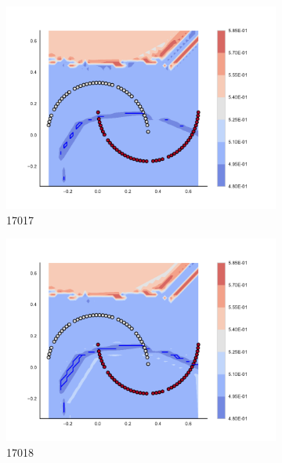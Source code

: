 \begin{figure}[h]
\begin{subfigure}[b]{0.09\textwidth}
    \includegraphics[clip, trim=2.35cm 1.75cm 4.5cm 0cm,width=\textwidth]{img/convergence/17017.pdf}
    \caption{17017}
    \label{fig:convergence_17017}
\end{subfigure}
%
\begin{subfigure}[b]{0.09\textwidth}
    \includegraphics[clip, trim=2.35cm 1.75cm 4.5cm 0cm,width=\textwidth]{img/convergence/17018.pdf}
    \caption{17018}
    \label{fig:convergence_17018}
\end{subfigure}
%
\begin{subfigure}[b]{0.09\textwidth}

\end{subfigure}
\end{figure}
